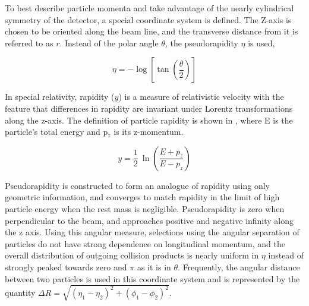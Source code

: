 To best describe particle momenta and take advantage of the nearly cylindrical symmetry of the detector, a special coordinate system is defined. 
The Z-axis is chosen to be oriented along the beam line, and the transverse distance from it is referred to as $r$. 
Instead of the polar angle $\theta$, the pseudorapidity $\eta$ is used,

\begin{equation}
    \label{eq:pseudo}
    \eta = - \log \left[\tan\left(\frac{\theta}{2}\right)\right]
\end{equation}

In special relativity, rapidity ($y$) is a measure of relativistic velocity with the feature that differences in rapidity are invariant under Lorentz transformations along the z-axis.
The definition of particle rapidity is shown in , where E is the particle's total energy and p$_z$ is its z-momentum.

\begin{equation}
    \label{eq:rapidity}
    y = \frac{1}{2} ~\ln \left(\frac{E+p_z}{E-p_z}\right)
\end{equation}

Pseudorapidity is constructed to form an analogue of rapidity using only geometric information, and converges to match rapidity in the limit of high particle energy when the rest mass is negligible.
Pseudorapidity is zero when perpendicular to the beam, and approaches positive and negative infinity along the z axis. 
Using this angular measure, selections using the angular separation of particles do not have strong dependence on longitudinal momentum, and the overall distribution of outgoing collision products is nearly uniform in $\eta$ instead of strongly peaked towards zero and $\pi$ as it is in $\theta$.  
Frequently, the angular distance between two particles is used in this coordinate system and is represented by the quantity $\Delta R = \sqrt{(\eta_1-\eta_2)^2+(\phi_1-\phi_2)^2}$.

